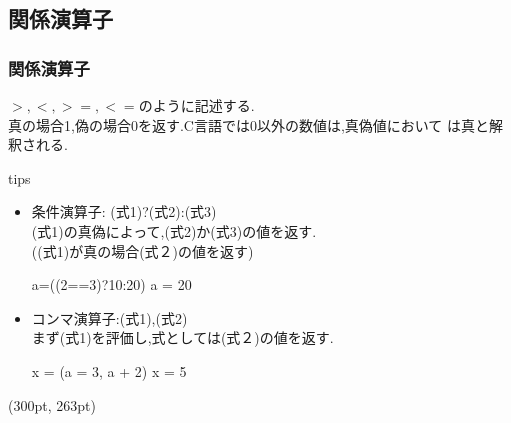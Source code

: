 \documentclass[dvipdfmx]{beamer}
\begin{document}
\subsection{関係演算子}
\begin{frame}[t, fragile, label=21]
    \frametitle{関係演算子}
    $>,<,>=,<=$のように記述する.\\
    真の場合1,偽の場合0を返す.C言語では0以外の数値は,真偽値において
    は真と解釈される.
    \begin{itembox}[l]{tips}
        \begin{itemize}
            \item 条件演算子: (式1)?(式2):(式3)\\
                (式1)の真偽によって,(式2)か(式3)の値を返す.\\
                ((式1)が真の場合(式２)の値を返す)
                \begin{block}{a=((2==3)?10:20)}
                    a = 20
                \end{block}
            \item コンマ演算子:(式1),(式2)\\
                まず(式1)を評価し,式としては(式２)の値を返す.
                \begin{block}{x = (a = 3, a + 2)}
                    x = 5
                \end{block}
        \end{itemize}
    \end{itembox}
    \begin{textblock*}{0.3\linewidth}(300pt, 263pt)
    \hyperlink{20}{}
    \space
    \hyperlink{22}{}
    \end{textblock*}
\end{frame}
\end{document}
